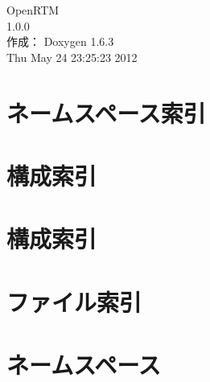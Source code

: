 \documentclass[a4paper]{book}
\begin{document}
\begin{titlepage}
\vspace*{7cm}
\begin{center}
{\Large OpenRTM \\[1ex]\large 1.0.0 }\\
\vspace*{1cm}
{\large 作成： Doxygen 1.6.3}\\
\vspace*{0.5cm}
{\small Thu May 24 23:25:23 2012}\\
\end{center}
\end{titlepage}
\clearemptydoublepage
{}
\tableofcontents
\clearemptydoublepage
{}
\chapter{ネームスペース索引}

\chapter{構成索引}

\chapter{構成索引}

\chapter{ファイル索引}

\chapter{ネームスペース}




\end{document}
